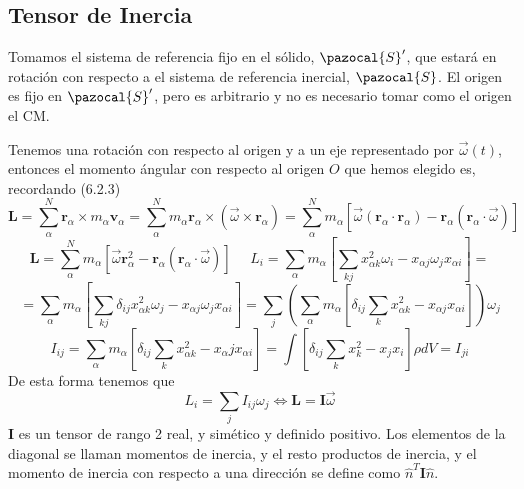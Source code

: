 \subsection{Tensor de Inercia}
Tomamos el sistema de referencia fijo en el sólido, $\pazocal{S}'$, que estará en rotación con respecto a el sistema de referencia inercial, $\pazocal{S}$. El origen es fijo en $\pazocal{S}'$, pero es arbitrario y no es necesario tomar como el origen el CM.

Tenemos una rotación con respecto al origen y a un eje representado por $\vec{\omega}(t)$, entonces el momento ángular con respecto al origen $O$ que hemos elegido es, recordando (6.2.3)
\[
    \mathbf{L} = \sum_\alpha^N \mathbf{r}_\alpha \times m_\alpha \mathbf{v}_\alpha = \sum_\alpha^N m_\alpha \mathbf{r}_\alpha \times (\vec{\omega} \times \mathbf{r}_\alpha) = \sum_\alpha^N m_\alpha \left[\vec{\omega} (\mathbf{r}_\alpha \cdot \mathbf{r}_\alpha) - \mathbf{r}_\alpha (\mathbf{r}_\alpha \cdot \vec{\omega})\right]
\]\vspace{-10pt}
\[
    \mathbf{L} = \sum_\alpha^N m_\alpha \left[\vec{\omega} \mathbf{r}_\alpha^2 - \mathbf{r}_\alpha (\mathbf{r}_\alpha \cdot \vec{\omega})\right] \ \ \ \ \ \ L_i = \sum_\alpha m_\alpha \left[ \sum_{kj} x^2_{\alpha k} \omega_i - x_{\alpha j} \omega_j x_{\alpha i}\right] = 
\]\vspace{-10pt}
\[
    = \sum_\alpha m_\alpha \left[ \sum_{kj} \delta_{ij}x^2_{\alpha k} \omega_j - x_{\alpha j} \omega_j x_{\alpha i}\right] = \sum_j \left(\sum_\alpha m_\alpha \left[\delta_{ij}\sum_k x^2_{\alpha k} - x_{\alpha j} x_{\alpha i}\right]\right) \omega_j
\]
\vspace{-10pt}
\begin{equation} \label{6.1.1}
    I_{ij} = \sum_\alpha m_\alpha \left[\delta_{ij} \sum_k x^2_{\alpha k} - x_\alpha j x_{\alpha i}\right] = \int \left[\delta_{ij}\sum_k x^2_{k} - x_{j} x_{i}\right] \rho dV = I_{ji}
\end{equation} 
De esta forma tenemos que
\begin{equation} \label{6.1.1}
    L_i = \sum_j I_{ij} \omega_j \iff \mathbf{L} = \mathbf{I} \vec{\omega}
\end{equation} 
$\mathbf{I}$ es un tensor de rango 2 real, y simético y definido positivo. Los elementos de la diagonal se llaman momentos de inercia, y el resto productos de inercia, y el momento de inercia con respecto a una dirección se define como $\hat{n}^T \mathbf{I} \hat{n}$.

